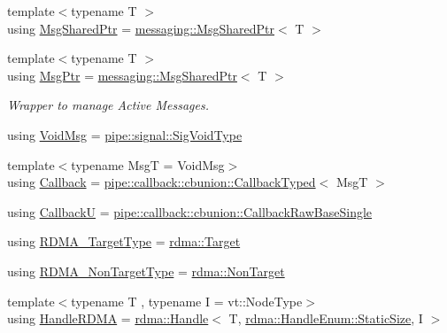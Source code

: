 \begin{DoxyCompactItemize}
\item 
{\footnotesize template$<$typename T $>$ }\\using \hyperlink{namespacevt_ab2b3d506ec8e8d1540aede826d84a239}{Msg\+Shared\+Ptr} = \hyperlink{structvt_1_1messaging_1_1_msg_shared_ptr}{messaging\+::\+Msg\+Shared\+Ptr}$<$ T $>$
\item 
{\footnotesize template$<$typename T $>$ }\\using \hyperlink{namespacevt_a9f5ebd62ee9d6dd8829e3e1cc4f858e9}{Msg\+Ptr} = \hyperlink{structvt_1_1messaging_1_1_msg_shared_ptr}{messaging\+::\+Msg\+Shared\+Ptr}$<$ T $>$
\begin{DoxyCompactList}\small\item\em Wrapper to manage Active Messages. \end{DoxyCompactList}\item 
using \hyperlink{namespacevt_ae108c204035ac2513c8d09e6971a4a31}{Void\+Msg} = \hyperlink{namespacevt_1_1pipe_1_1signal_acbe257d1ae44f20fa9fd9b6ed3057caf}{pipe\+::signal\+::\+Sig\+Void\+Type}
\item 
{\footnotesize template$<$typename MsgT  = Void\+Msg$>$ }\\using \hyperlink{namespacevt_a36db99df4c973d48b1118a293fff533f}{Callback} = \hyperlink{structvt_1_1pipe_1_1callback_1_1cbunion_1_1_callback_typed}{pipe\+::callback\+::cbunion\+::\+Callback\+Typed}$<$ MsgT $>$
\item 
using \hyperlink{namespacevt_af79a43a97bc3593fc349f086c874c48e}{CallbackU} = \hyperlink{structvt_1_1pipe_1_1callback_1_1cbunion_1_1_callback_raw_base_single}{pipe\+::callback\+::cbunion\+::\+Callback\+Raw\+Base\+Single}
\item 
using \hyperlink{namespacevt_a9bf03a57102d0274cc229b9ef94bb59e}{R\+D\+M\+A\+\_\+\+Target\+Type} = \hyperlink{structvt_1_1rdma_1_1_target}{rdma\+::\+Target}
\item 
using \hyperlink{namespacevt_ae5bd2866e5ee83f4d6a53e8730cd3202}{R\+D\+M\+A\+\_\+\+Non\+Target\+Type} = \hyperlink{structvt_1_1rdma_1_1_non_target}{rdma\+::\+Non\+Target}
\item 
{\footnotesize template$<$typename T , typename I  = vt\+::\+Node\+Type$>$ }\\using \hyperlink{namespacevt_abc3449a4b87363b942453d0b8cc18a7d}{Handle\+R\+D\+MA} = \hyperlink{structvt_1_1rdma_1_1_handle}{rdma\+::\+Handle}$<$ T, \hyperlink{namespacevt_1_1rdma_a0234ff19cfb3c04718cfdfd36b2d6d88a0c5c41d6a0319a61d3a5e8a060b7c4d7}{rdma\+::\+Handle\+Enum\+::\+Static\+Size}, I $>$
\item 

\end{DoxyCompactItemize}
